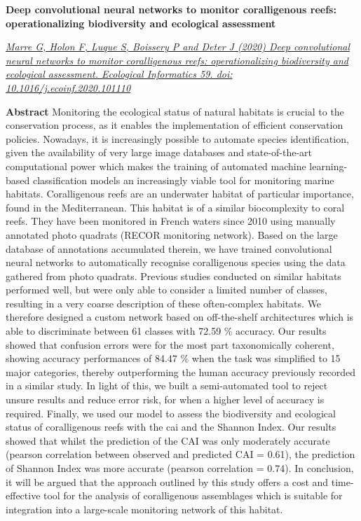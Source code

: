 \clearpage

\noindent\textbf{Deep convolutional neural networks to monitor coralligenous reefs: operationalizing biodiversity and ecological assessment}


\noindent\href{https://doi.org/10.1016/j.ecoinf.2020.101110}{\textit{Marre G, Holon F, Luque S, Boissery P and Deter J (2020) Deep convolutional neural networks to monitor coralligenous reefs: operationalizing biodiversity and ecological assessment. Ecological Informatics 59. doi: 10.1016/j.ecoinf.2020.101110}}

\medskip

\noindent\textbf{Abstract}
Monitoring the ecological status of natural habitats is crucial to the conservation process, as it enables the implementation of efficient conservation policies. Nowadays, it is increasingly possible to automate species identification, given the availability of very large image databases and state-of-the-art computational power which makes the training of automated machine learning-based classification models an increasingly viable tool for monitoring marine habitats. Coralligenous reefs are an underwater habitat of particular importance, found in the Mediterranean. This habitat is of a similar biocomplexity to coral reefs. They have been monitored in French waters since 2010 using manually annotated photo quadrats (RECOR monitoring network). Based on the large database of annotations accumulated therein, we have trained convolutional neural networks to automatically recognise coralligenous species using the data gathered from photo quadrats. Previous studies conducted on similar habitats performed well, but were only able to consider a limited number of classes, resulting in a very coarse description of these often-complex habitats. We therefore designed a custom network based on off-the-shelf architectures which is able to discriminate between 61 classes with 72.59 \% accuracy. Our results showed that confusion errors were for the most part taxonomically coherent, showing accuracy performances of 84.47 \% when the task was simplified to 15 major categories, thereby outperforming the human accuracy previously recorded in a similar study. In light of this, we built a semi-automated tool to reject unsure results and reduce error risk, for when a higher level of accuracy is required. Finally, we used our model to assess the biodiversity and ecological status of coralligenous reefs with the \gls{cai} and the Shannon Index. Our results showed that whilst the prediction of the CAI was only moderately accurate (pearson correlation between observed and predicted CAI = 0.61), the prediction of Shannon Index was more accurate (pearson correlation = 0.74). In conclusion, it will be argued that the approach outlined by this study offers a cost and time-effective tool for the analysis of coralligenous assemblages which is suitable for integration into a large-scale monitoring network of this habitat.

